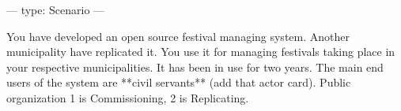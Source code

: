 ---
type: Scenario
---

You have developed an open source festival managing system. Another municipality have replicated it. You use it for managing festivals taking place in your respective municipalities. It has been in use for two years. The main end users of the system are **civil servants** (add that actor card).
Public organization 1 is Commissioning, 2 is Replicating.
